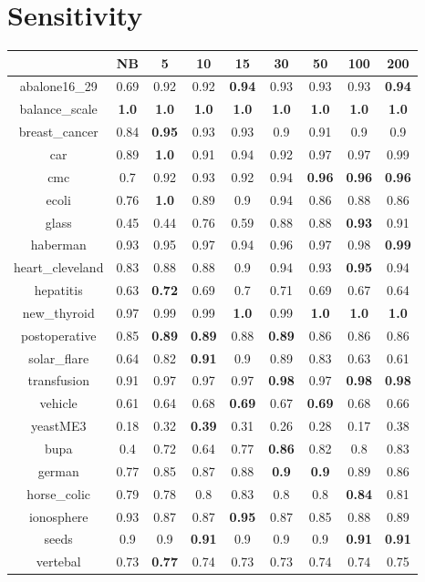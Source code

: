 \documentclass{article}%
\begin{document}
%
\section*{Sensitivity}%
\begin{tabular}{c|cccccccc}%
\hline%
&NB&5&10&15&30&50&100&200\\%
\hline%
abalone16\_29&0.69&0.92&0.92&\textbf{0.94}&0.93&0.93&0.93&\textbf{0.94}\\%
\hline%
balance\_scale&\textbf{1.0}&\textbf{1.0}&\textbf{1.0}&\textbf{1.0}&\textbf{1.0}&\textbf{1.0}&\textbf{1.0}&\textbf{1.0}\\%
\hline%
breast\_cancer&0.84&\textbf{0.95}&0.93&0.93&0.9&0.91&0.9&0.9\\%
\hline%
car&0.89&\textbf{1.0}&0.91&0.94&0.92&0.97&0.97&0.99\\%
\hline%
cmc&0.7&0.92&0.93&0.92&0.94&\textbf{0.96}&\textbf{0.96}&\textbf{0.96}\\%
\hline%
ecoli&0.76&\textbf{1.0}&0.89&0.9&0.94&0.86&0.88&0.86\\%
\hline%
glass&0.45&0.44&0.76&0.59&0.88&0.88&\textbf{0.93}&0.91\\%
\hline%
haberman&0.93&0.95&0.97&0.94&0.96&0.97&0.98&\textbf{0.99}\\%
\hline%
heart\_cleveland&0.83&0.88&0.88&0.9&0.94&0.93&\textbf{0.95}&0.94\\%
\hline%
hepatitis&0.63&\textbf{0.72}&0.69&0.7&0.71&0.69&0.67&0.64\\%
\hline%
new\_thyroid&0.97&0.99&0.99&\textbf{1.0}&0.99&\textbf{1.0}&\textbf{1.0}&\textbf{1.0}\\%
\hline%
postoperative&0.85&\textbf{0.89}&\textbf{0.89}&0.88&\textbf{0.89}&0.86&0.86&0.86\\%
\hline%
solar\_flare&0.64&0.82&\textbf{0.91}&0.9&0.89&0.83&0.63&0.61\\%
\hline%
transfusion&0.91&0.97&0.97&0.97&\textbf{0.98}&0.97&\textbf{0.98}&\textbf{0.98}\\%
\hline%
vehicle&0.61&0.64&0.68&\textbf{0.69}&0.67&\textbf{0.69}&0.68&0.66\\%
\hline%
yeastME3&0.18&0.32&\textbf{0.39}&0.31&0.26&0.28&0.17&0.38\\%
\hline%
bupa&0.4&0.72&0.64&0.77&\textbf{0.86}&0.82&0.8&0.83\\%
\hline%
german&0.77&0.85&0.87&0.88&\textbf{0.9}&\textbf{0.9}&0.89&0.86\\%
\hline%
horse\_colic&0.79&0.78&0.8&0.83&0.8&0.8&\textbf{0.84}&0.81\\%
\hline%
ionosphere&0.93&0.87&0.87&\textbf{0.95}&0.87&0.85&0.88&0.89\\%
\hline%
seeds&0.9&0.9&\textbf{0.91}&0.9&0.9&0.9&\textbf{0.91}&\textbf{0.91}\\%
\hline%
vertebal&0.73&\textbf{0.77}&0.74&0.73&0.73&0.74&0.74&0.75\\%
\hline%
\end{tabular}
\end{document}
